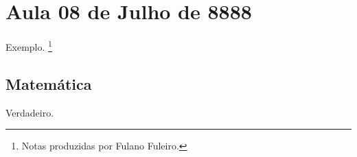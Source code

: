 \section{Aula 08 de Julho de 8888}
\label{8888_07_08}

Exemplo.
\footnote{Notas produzidas por Fulano Fuleiro.}

\subsection{Matemática}

\begin{teorema}
Verdadeiro.
\end{teorema}
